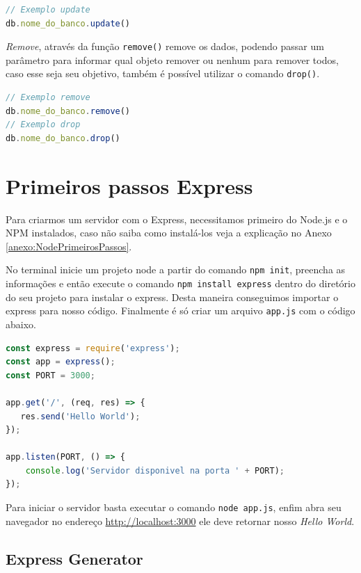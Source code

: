 \documentclass[
	12pt,				%
	openright,			%
	twoside,			%
	a4paper,			%
	english,			%
	brazil				%
	]{abntex2}
\begin{document}
\begin{anexosenv}
\begin{lstlisting}[language=javascript]
// Exemplo update
db.nome_do_banco.update()
\end{lstlisting}

\textit{Remove}, através da função \verb|remove()| remove os dados, podendo passar um parâmetro para informar qual objeto remover ou nenhum para remover todos, caso esse seja seu objetivo, também é possível utilizar o comando \verb|drop()|.

\begin{lstlisting}[language=javascript]
// Exemplo remove
db.nome_do_banco.remove()
// Exemplo drop
db.nome_do_banco.drop()
\end{lstlisting}

\chapter {Primeiros passos Express}

Para criarmos um servidor com o Express, necessitamos primeiro do Node.js e o NPM instalados, caso não saiba como instalá-los veja a explicação no Anexo \ref{anexo:NodePrimeirosPassos}.

No terminal inicie um projeto node a partir do comando \verb|npm init|, preencha as informações e então execute o comando \verb|npm install express| dentro do diretório do seu projeto para instalar o express. Desta maneira conseguimos importar o express para nosso código. Finalmente é só criar um arquivo \verb|app.js| com o código abaixo.

\begin{lstlisting}[language=javascript]
const express = require('express');
const app = express();
const PORT = 3000;

app.get('/', (req, res) => {
   res.send('Hello World');
});

app.listen(PORT, () => {
    console.log('Servidor disponivel na porta ' + PORT);
});
\end{lstlisting}

Para iniciar o servidor basta executar o comando \verb|node app.js|, enfim abra seu navegador no endereço \href{http://localhost:3000}{http://localhost:3000} ele deve retornar nosso \textit{Hello World}.

\section{Express Generator}


\end{anexosenv}
\end{document}
